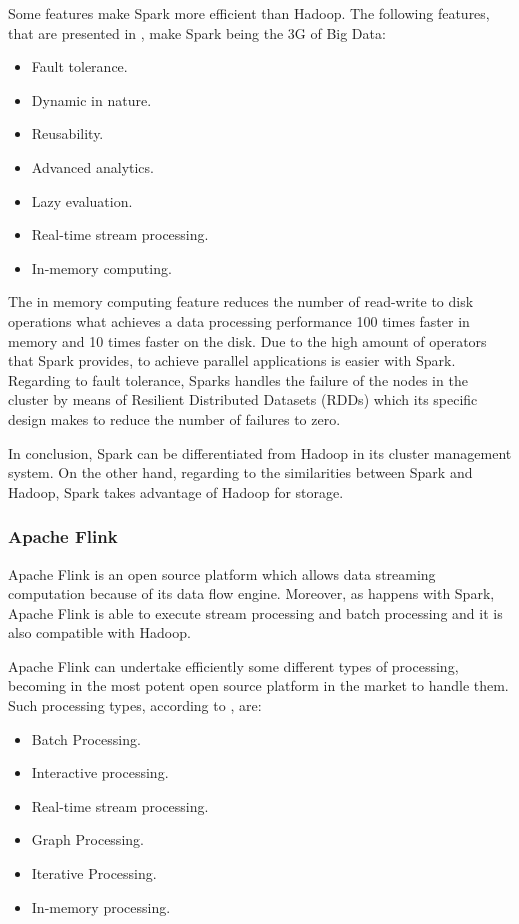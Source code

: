 Some features make Spark more efficient than Hadoop. The following features, that are presented in \cite{sparkwebsite}, make Spark being the 3G of Big Data:

\begin{itemize}

\item Fault tolerance.
\item Dynamic in nature.
\item Reusability.
\item Advanced analytics.
\item Lazy evaluation.
\item Real-time stream processing.
\item In-memory computing.

\end{itemize}

The in memory computing feature reduces the number of read-write to disk operations what achieves a data processing performance 100 times faster in memory and 10 times faster on the disk. Due to the high amount of operators that Spark provides, to achieve parallel applications is easier with Spark. Regarding to fault tolerance, Sparks handles the failure of the nodes in the cluster by means of Resilient Distributed Datasets (RDDs) which its specific design makes to reduce the number of failures to zero.

In conclusion, Spark can be differentiated from Hadoop in its cluster management system. On the other hand, regarding to the similarities between Spark and Hadoop, Spark takes advantage of Hadoop for storage.

\subsubsection{Apache Flink}

Apache Flink is an open source platform which allows data streaming computation because of its data flow engine. Moreover, as happens with Spark, Apache Flink is able to execute stream processing and batch processing and it is also compatible with Hadoop.

Apache Flink can undertake efficiently some different types of processing, becoming in the most potent open source platform in the market to handle them. Such processing types, according to \cite{flinkwebsite}, are:

\begin{itemize}

\item Batch Processing.
\item Interactive processing.
\item Real-time stream processing.
\item Graph Processing.
\item Iterative Processing.
\item In-memory processing.

\end{itemize}

